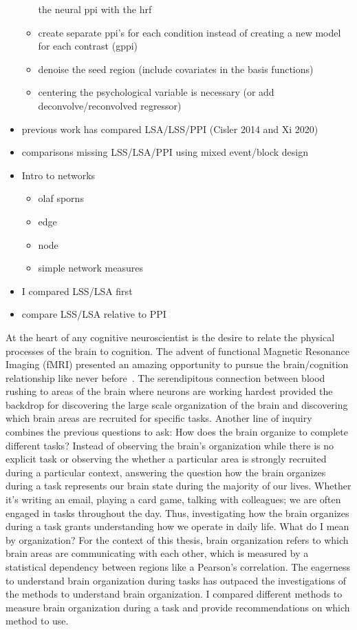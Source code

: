 \documentclass[phd,appendix,figures]{uithesis}
\begin{document}
\begin{itemize}
\begin{itemize}
			the neural ppi with the hrf
		\item create separate ppi's for each condition instead of creating a
		      new model for each contrast (gppi)
		\item denoise the seed region (include covariates in the basis functions)
		\item centering the psychological variable is necessary (or add deconvolve/reconvolved regressor)
	\end{itemize}
	\item previous work has compared LSA/LSS/PPI (Cisler 2014 and Xi 2020)
	\item comparisons missing LSS/LSA/PPI using mixed event/block design
	\item Intro to networks
	\begin{itemize}
		\item olaf sporns
		\item edge
		\item node
		\item simple network measures
	\end{itemize}
	\item I compared LSS/LSA first
	\item compare LSS/LSA relative to PPI
\end{itemize}
At the heart of any cognitive neuroscientist is the desire to relate the physical
processes of the brain to cognition.
The advent of functional Magnetic Resonance Imaging (fMRI) presented an amazing opportunity
to pursue the brain/cognition relationship like never before~\cite{ogawa1990}.
The serendipitous connection between blood rushing to areas of the brain where neurons
are working hardest provided the backdrop for discovering the large scale organization
of the brain and discovering which brain areas are recruited for specific tasks.
Another line of inquiry combines the previous questions to ask: How does the brain
organize to complete different tasks?
Instead of observing the brain's organization while there is no explicit task or observing
the whether a particular area is strongly recruited during a particular context,
answering the question how the brain organizes during a task represents our brain state
during the majority of our lives.
Whether it's writing an email, playing a card game, talking with colleagues; we are
often engaged in tasks throughout the day.
Thus, investigating how the brain organizes during a task grants understanding how
we operate in daily life.
What do I mean by organization?
For the context of this thesis, brain organization refers to which brain areas are communicating
with each other, which is measured by a statistical dependency between
regions like a Pearson's correlation.
The eagerness to understand brain organization during tasks has outpaced the investigations
of the methods to understand brain organization.
I compared different methods to measure brain organization during a task
and provide recommendations on which method to use.
\end{document}
